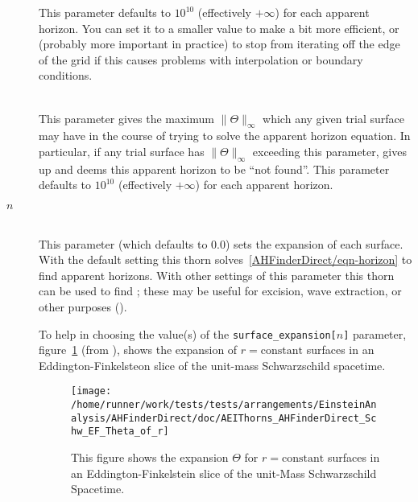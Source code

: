 \begin{description}
	This parameter defaults to $10^{10}$ (effectively $+\infty$)
	for each apparent horizon.  You can set it to a smaller value
	to make  a bit more efficient, or
	(probably more important in practice) to stop
	 from iterating off the edge of the grid
	if this causes problems with interpolation or boundary conditions.

\item[\code{max\_allowable\_Theta}]
\mbox{}\\
	This parameter gives the maximum $\|\Theta\|_\infty$
	which any given trial surface may have in the course of
	trying to solve the apparent horizon equation.
	In particular, if any trial surface has $\|\Theta\|_\infty$
	exceeding this parameter,  gives up
	and deems this apparent horizon to be ``not found''.
	This parameter defaults to $10^{10}$ (effectively $+\infty$)
	for each apparent horizon.

\item[\code{surface\_expansion[}$n$\code{]}]
\mbox{}\\
	This parameter (which defaults to 0.0) sets the expansion
	of each surface.  With the default setting this thorn
	solves~\eqref{AHFinderDirect/eqn-horizon} to find apparent
	horizons.  With other settings of this parameter this thorn
	can be used to find ;
	these may be useful for excision, wave extraction, or
	other purposes (\cite{AHFinderDirect/Schnetter03a}).

	To help in choosing the value(s) of the
	\verb|surface_expansion[|$n$\verb|]| parameter,
	figure~\ref{AHFinderDirect/fig-Schwarzschild-EF-Theta(r)}
	(from \cite{AHFinderDirect/Thornburg95}),
	shows the expansion of $r = \text{constant}$ surfaces
	in an Eddington-Finkelsteon slice of the unit-mass
	Schwarzschild spacetime.

\begin{figure}[htbp]
\begin{center}
\texttt{[image: /home/runner/work/tests/tests/arrangements/EinsteinAnalysis/AHFinderDirect/doc/AEIThorns\_AHFinderDirect\_Schw\_EF\_Theta\_of\_r]}
\end{center}
\caption[Expansion $\Theta$ for $r = \text{constant}$ Surfaces
	 in an Eddington-Finkelstein slice
	 of the Unit-Mass Schwarzschild Spacetime]
	{
	This figure shows the expansion $\Theta$ for $r = \text{constant}$
	surfaces in an Eddington-Finkelstein slice of the unit-Mass
	Schwarzschild Spacetime.
	}
\label{AHFinderDirect/fig-Schwarzschild-EF-Theta(r)}
\end{figure}

\end{description}

